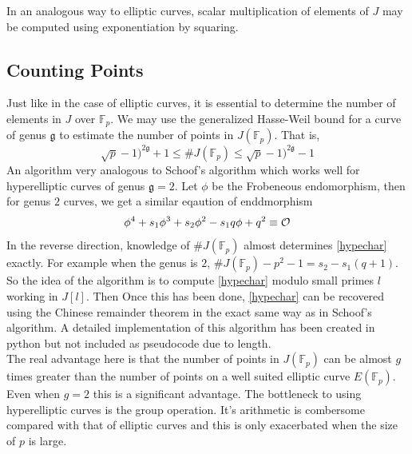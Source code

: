 In an analogous way to elliptic curves, scalar multiplication of elements of $J$ may be computed using exponentiation by squaring. 

\subsection{Counting Points}

Just like in the case of elliptic curves, it is essential to determine the number of elements in $J$ over $\mathbb{F}_p$. We may use the generalized Hasse-Weil bound for a curve of genus $\mathfrak{g}$ to estimate the number of points in $J(\mathbb{F}_p)$. That is, 
$$
\sqrt{p} - 1)^{2\mathfrak{g}} + 1 \leq \# J(\mathbb{F}_p) \leq  \sqrt{p} - 1)^{2\mathfrak{g}} - 1
$$
An algorithm very analogous to Schoof's algorithm which works well for hyperelliptic curves of genus $\mathfrak{g} = 2$. Let $\phi$ be the Frobeneous endomorphism, then for genus $2$ curves, we get a similar eqaution of enddmorphism 
\begin{equation} \label{hypechar}
	\phi^4 + s_1  \phi^3 + s_2 \phi^2 - s_1q \phi + q^2 \equiv \mathcal{O} 
\end{equation}
In the reverse direction, knowledge of  $\# J(\mathbb{F}_p)$ almost determines \eqref{hypechar} exactly. For example when the genus is $2$, $\# J(\mathbb{F}_p) - p^2 - 1 = s_2 -s_1(q+1)$. So the idea of the algorithm is to compute \eqref{hypechar} modulo small primes $l$ working in $J[l]$. Then Once this has been done, \eqref{hypechar} can be recovered using the Chinese remainder theorem in the exact same way as in Schoof's algorithm. A detailed implementation of this algorithm has been created in python but not included as pseudocode due to length. \\

The real advantage here is that the number of points in $J(\mathbb{F}_p)$ can be almost $g$ times greater than the number of points on a well suited elliptic curve $E(\mathbb{F}_p)$. Even when $g = 2$ this is a significant advantage. The bottleneck to using hyperelliptic curves is the group operation. It's arithmetic is combersome compared with that of elliptic curves and this is only exacerbated when the size of $p$ is large.  





